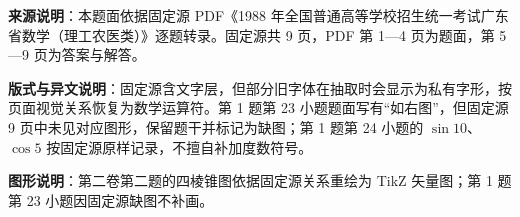 


\begin{gktip}
\textbf{来源说明}：本题面依据固定源 PDF《1988 年全国普通高等学校招生统一考试广东省数学（理工农医类）》逐题转录。固定源共 9 页，PDF 第 1—4 页为题面，第 5—9 页为答案与解答。

\textbf{版式与异文说明}：固定源含文字层，但部分旧字体在抽取时会显示为私有字形，按页面视觉关系恢复为数学运算符。第 1 题第 23 小题题面写有“如右图”，但固定源 9 页中未见对应图形，保留题干并标记为缺图；第 1 题第 24 小题的 $\sin 10$、$\cos 5$ 按固定源原样记录，不擅自补加度数符号。

\textbf{图形说明}：第二卷第二题的四棱锥图依据固定源关系重绘为 TikZ 矢量图；第 1 题第 23 小题因固定源缺图不补画。
\end{gktip}

